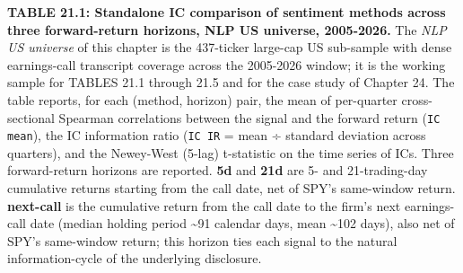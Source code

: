 \textbf{TABLE 21.1: Standalone IC comparison of sentiment methods across three forward-return horizons, NLP US universe, 2005-2026.} The \textit{NLP US universe} of this chapter is the 437-ticker large-cap US sub-sample with dense earnings-call transcript coverage across the 2005-2026 window; it is the working sample for TABLES 21.1 through 21.5 and for the case study of Chapter 24. The table reports, for each (method, horizon) pair, the mean of per-quarter cross-sectional Spearman correlations between the signal and the forward return (\texttt{IC mean}), the IC information ratio (\texttt{IC IR} = mean ÷ standard deviation across quarters), and the Newey-West (5-lag) t-statistic on the time series of ICs. Three forward-return horizons are reported. \textbf{5d} and \textbf{21d} are 5- and 21-trading-day cumulative returns starting from the call date, net of SPY's same-window return. \textbf{next-call} is the cumulative return from the call date to the firm's next earnings-call date (median holding period {\textasciitilde}91 calendar days, mean {\textasciitilde}102 days), also net of SPY's same-window return; this horizon ties each signal to the natural information-cycle of the underlying disclosure.

